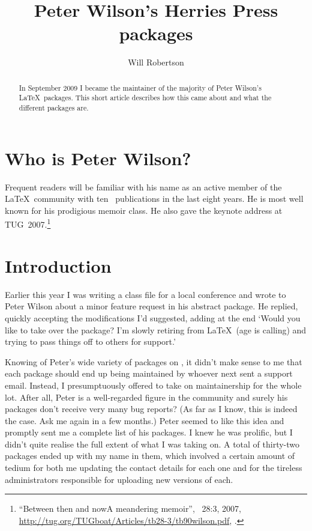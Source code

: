 \documentclass[final]{ltugboat}
\title{Peter Wilson's Herries Press packages}
\author{Will Robertson}
\begin{document}
\maketitle
\begin{abstract}
In September 2009 I became the maintainer of the majority of Peter Wilson's \LaTeX\ packages. This short article describes how this came about and what the different packages are.
\end{abstract}

\section{Who is Peter Wilson?}

Frequent readers will be familiar with his name as an active member of the \LaTeX\ community with ten \TUB\ publications in the last eight years. He is most well known for his prodigious \textsf{memoir} class. He also gave the keynote address at TUG~2007.\footnote{%
``Between then and now\Dash A meandering memoir'', \TUB\ 28:3, 2007, \url{http://tug.org/TUGboat/Articles/tb28-3/tb90wilson.pdf},
.}

\section{Introduction}

Earlier this year I was writing a class file for a local conference and wrote to Peter Wilson about a minor feature request in his \textsf{abstract} package. He replied, quickly accepting the modifications I'd suggested, adding at the end `{Would you like to take over the package? I'm slowly retiring from \LaTeX\ (age is calling) and trying to pass things off to others for support.}'

Knowing of Peter's wide variety of packages on , it didn't make sense to me that each package should end up being maintained by whoever next sent a support email. Instead, I presumptuously offered to take on maintainership for the whole lot. After all, Peter is a well-regarded figure in the community and surely his packages don't receive very many bug reports? (As far as I know, this is indeed the case. Ask me again in a few months.) Peter seemed to like this idea and promptly sent me a complete list of his packages. I knew he was prolific, but I didn't quite realise the full extent of what I was taking on. A total of thirty-two packages ended up with my name in them, which involved a certain amount of tedium for both me updating the contact details for each one and for the tireless  administrators responsible for uploading new versions of each.
\end{document}
